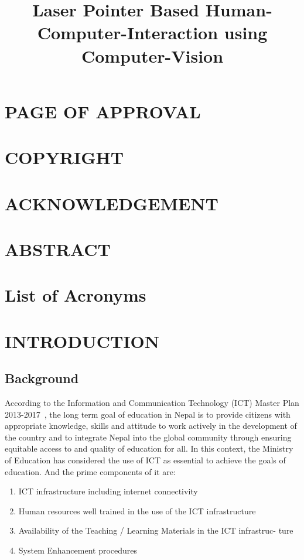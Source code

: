 \documentclass[12pt, a4paper]{article}
\title{\textbf{Laser Pointer Based Human-Computer-Interaction using Computer-Vision}}
\begin{document}
	
	
	\setcounter{page}{2}
	\section*{PAGE OF APPROVAL}
		
	\newpage
	\section*{COPYRIGHT}
		
	\newpage
	
	\section*{ACKNOWLEDGEMENT}
		
	
	\newpage
	\section*{ABSTRACT}
	
	
	
	\newpage
	\tableofcontents 
	\newpage
	\listoffigures
	\newpage
	\listoftables
	\newpage
	\section*{List of Acronyms}
		
	\clearpage
	\linespread{1.5}
	\newpage
\section{INTRODUCTION}
\subsection{Background}
According to the Information and Communication Technology (ICT) Master Plan 2013-2017~\cite{kir}, the long term
goal of education in Nepal is to provide citizens with appropriate knowledge,
skills and attitude to work actively in the development of the country and to
integrate Nepal into the global community through ensuring equitable access
to and quality of education for all. In this context, the Ministry of Education
has considered the use of ICT as essential to achieve the goals of education. And the prime components of it are:
\begin{enumerate}
\item ICT infrastructure including internet connectivity
\item Human resources well trained in the use of the ICT infrastructure
\item Availability of the Teaching / Learning Materials in the ICT infrastruc-
ture
\item System Enhancement procedures
\end{enumerate}
\end{document}
